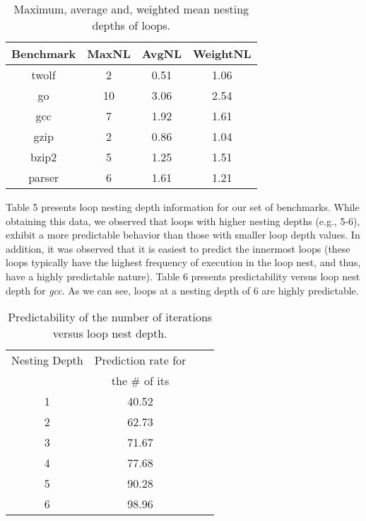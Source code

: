 \documentclass[times,10pt,twocolumn]{article}
\begin{document}
\begin{table}[htb]
\caption{Maximum, average and, weighted mean nesting depths of loops.}
\begin{center} 
{\footnotesize
\begin{tabular}{|c|c|c|c|}
\hline 
Benchmark & MaxNL & AvgNL & WeightNL\\ \hline \hline 
twolf & 2 & 0.51 & 1.06 \\ \hline 
go & 10 & 3.06 & 2.54 \\ \hline 
gcc & 7 & 1.92 & 1.61 \\ \hline 
gzip & 2 & 0.86 & 1.04 \\ \hline 
bzip2 & 5 & 1.25 & 1.51 \\ \hline 
parser & 6 & 1.61 & 1.21 \\ \hline
\end{tabular}
}
\end{center}
\end{table}

Table 5 presents loop nesting depth information for our set of benchmarks.
While obtaining this data, we observed that loops with 
higher nesting depths (e.g., 5-6), exhibit a more predictable behavior than those 
with smaller loop depth values. In addition, it was observed that it is easiest
to predict the innermost loops (these loops typically have the highest
frequency of execution in the loop nest, and thus, have a highly 
predictable nature). Table 6 presents predictability versus loop nest depth
for {\it gcc}.  As we can see, loops at a nesting depth of 6 are highly predictable.

\begin{table}[htb]
\caption{Predictability of the number of iterations versus loop nest depth.}
\begin{center} 
{\footnotesize
\begin{tabular}{|c|c|c|c|}
\hline 
Nesting Depth & Prediction rate for \\ 
              & the \# of its \\ \hline \hline 

1 & 40.52 \\ \hline 
2 & 62.73 \\ \hline 
3 & 71.67 \\ \hline 
4 & 77.68 \\ \hline 
5 & 90.28 \\ \hline 
6 & 98.96 \\ \hline
\end{tabular}
}
\end{center}
\end{table}
\end{document}
